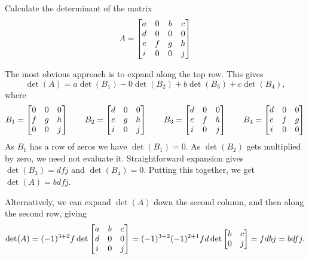 \documentclass[a4paper]{amsart}
\renewenvironment{solution}{\SolutionInline}{\endSolutionInline}
\begin{document}
\begin{exercise}\label{ex-det-i}
 Calculate the determinant of the matrix
 \[ A = 
     \left[\begin{matrix} 
      a & 0 & b & c \\
      d & 0 & 0 & 0 \\
      e & f & g & h \\
      i & 0 & 0 & j 
     \end{matrix}\right]
 \]
\end{exercise}
\begin{solution}
 The most obvious approach is to expand along the top row.  This gives 
 \[ \det(A) = a\det(B_1) - 0\det(B_2) + b\det(B_3) + c\det(B_4), \]
 where 
 \[ 
  B_1 = \left[\begin{matrix} 0&0&0 \\ f&g&h \\ 0&0&j \end{matrix}\right] \qquad
  B_2 = \left[\begin{matrix} d&0&0 \\ e&g&h \\ i&0&j \end{matrix}\right] \qquad
  B_3 = \left[\begin{matrix} d&0&0 \\ e&f&h \\ i&0&j \end{matrix}\right] \qquad
  B_4 = \left[\begin{matrix} d&0&0 \\ e&f&g \\ i&0&0 \end{matrix}\right]
 \]
 As $B_1$ has a row of zeros we have $\det(B_1)=0$.  As $\det(B_2)$
 gets multiplied by zero, we need not evaluate it.  Straightforward
 expansion gives $\det(B_3)=dfj$ and $\det(B_4)=0$.  Putting this
 together, we get $\det(A)=bdfj$.

 Alternatively, we can expand $\det(A)$ down the second column, and
 then along the second row, giving 
 \[ 
  \det(A) = (-1)^{3+2}f \det\left[\begin{matrix} a&b&c \\ d&0&0 \\ i&0&j \end{matrix}\right] 
    = (-1)^{3+2} (-1)^{2+1} fd\det\left[\begin{matrix} b&c \\ 0&j\end{matrix}\right] 
    = fdbj = bdfj.
 \]
\end{solution}
\end{document}
